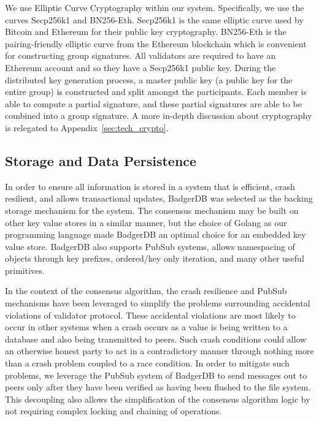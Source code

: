 We use Elliptic Curve Cryptography within our system.
Specifically, we use the curves Secp256k1 and BN256-Eth.
Secp256k1 is the same elliptic curve used by Bitcoin and Ethereum
for their public key cryptography.
BN256-Eth is the pairing-friendly elliptic curve from the Ethereum
blockchain which is convenient for constructing group signatures.
All validators are required to have an Ethereum account and so they
have a Secp256k1 public key.
During the distributed key generation process, a master public key (a
public key for the entire group) is constructed and split amongst the
participants.
Each member is able to compute a partial signature, and these partial
signatures are able to be combined into a group signature.
A more in-depth discussion about cryptography is relegated to
Appendix~\ref{sec:tech_crypto}.


\subsection{Storage and Data Persistence}

In order to ensure all information is stored in a system that is
efficient, crash resilient, and allows transactional updates, BadgerDB
was selected as the backing storage mechanism for the system.
The consensus mechanism may be built on other key value stores in a
similar manner, but the choice of Golang as our programming language
made BadgerDB an optimal choice for an embedded key value store.
BadgerDB also supports PubSub systems, allows namespacing of objects
through key prefixes, ordered/key only iteration, and many other useful
primitives.

In the context of the consensus algorithm, the crash resilience and
PubSub mechanisms have been leveraged to simplify the problems
surrounding accidental violations of validator protocol.
These accidental violations are most likely to occur in other systems
when a crash occurs as a value is being written to a database and also
being transmitted to peers.
Such crash conditions could allow an otherwise honest party to act in a
contradictory manner through nothing more than a crash problem coupled
to a race condition.
In order to mitigate such problems, we leverage the PubSub system of
BadgerDB to send messages out to peers only after they have been
verified as having been flushed to the file system.
This decoupling also allows the simplification of the consensus
algorithm logic by not requiring complex locking and chaining of
operations.

